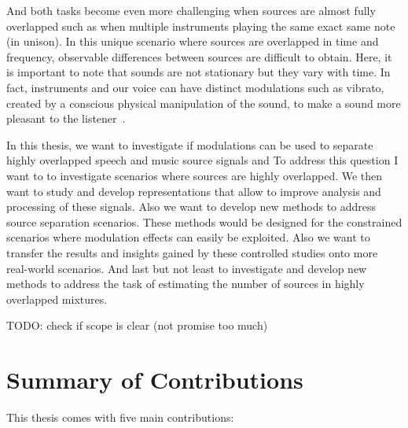 And both tasks become even more challenging when sources are almost fully overlapped such as when multiple instruments playing the same exact same note (in unison).
In this unique scenario where sources are overlapped in time and frequency, observable differences between sources are difficult to obtain.
Here, it is important to note that sounds are not stationary but they vary with time.
In fact, instruments and our voice can have distinct modulations such as vibrato, created by a conscious physical manipulation of the sound, to make a sound more pleasant to the listener~\cite{fletcher01}.
\par
In this thesis, we want to investigate if modulations can be used to separate highly overlapped speech and music source signals and 
To address this question I want to to investigate scenarios where sources are highly overlapped.
We then want to study and develop representations that allow to improve analysis and processing of these signals.
Also we want to develop new methods to address source separation scenarios. 
These methods would be designed for the constrained scenarios where modulation effects can easily be exploited.
Also we want to transfer the results and insights gained by these controlled studies onto more real-world scenarios.
And last but not least to investigate and develop new methods to address the task of estimating the number of sources in highly overlapped mixtures.

TODO: check if scope is clear (not promise too much)


\clearpage
\section{Summary of Contributions}

This thesis comes with five main contributions:

